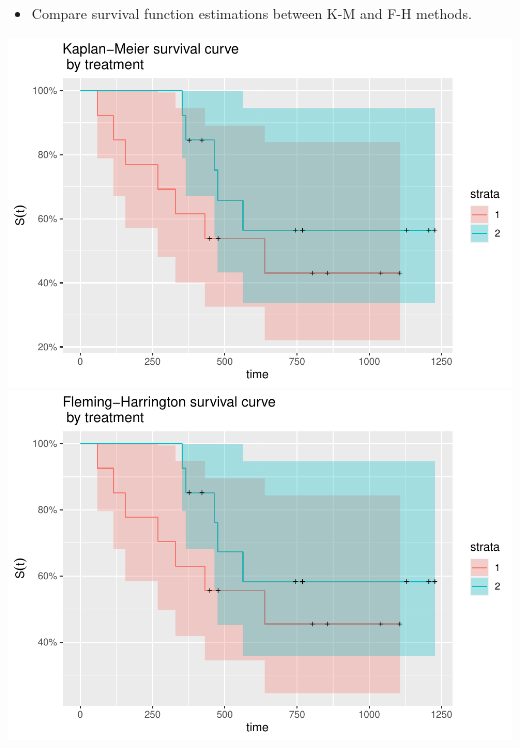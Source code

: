 \documentclass[
]{article}
\providecommand{\tightlist}{%
  \setlength{\itemsep}{0pt}\setlength{\parskip}{0pt}}
\begin{document}
\begin{itemize}
\tightlist
\item
  Compare survival function estimations between K-M and F-H methods.
\end{itemize}

\includegraphics[width=0.6\linewidth]{P8108-hw3-rw2844_files/figure-latex/f_h_survival-1}
\includegraphics[width=0.6\linewidth]{P8108-hw3-rw2844_files/figure-latex/f_h_survival-2}
\end{document}
